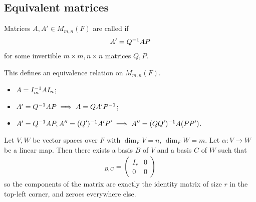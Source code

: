 \subsection{Equivalent matrices}
\begin{definition}
    Matrices $A, A' \in M_{m, n}(F)$ are called  if
    \begin{align*}
        A' = Q^{-1} AP
    \end{align*}
    for some invertible $m \times m, n \times n$ matrices $Q, P$.
\end{definition}
\begin{remark}
    This defines an equivalence relation on $M_{m,n}(F)$.
    \begin{itemize}
        \item $A = I_m^{-1} A I_n$;
        \item $A' = Q^{-1} AP \implies A = Q A' P^{-1}$;
        \item $A' = Q^{-1} AP, A'' = (Q')^{-1} A'P' \implies A'' = (QQ')^{-1} A(PP')$.
    \end{itemize}
\end{remark}
\begin{proposition}
    Let $V, W$ be vector spaces over $F$ with $\dim_F V = n$, $\dim_F W = m$.
    Let $\alpha \colon V \to W$ be a linear map.
    Then there exists a basis $B$ of $V$ and a basis $C$ of $W$ such that
    \begin{align*}
        [\alpha]_{B,C} = \begin{pmatrix}
            I_r & 0 \\
            0   & 0
        \end{pmatrix}
    \end{align*}
    so the components of the matrix are exactly the identity matrix of size $r$ in the top-left corner, and zeroes everywhere else.
\end{proposition}
